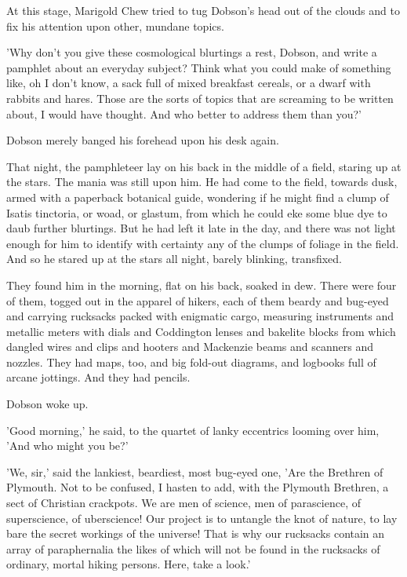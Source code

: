 At this stage, Marigold Chew tried to tug Dobson's head out of the clouds and to fix his attention upon other, mundane topics.

'Why don't you give these cosmological blurtings a rest, Dobson, and write a pamphlet about an everyday subject? Think what you could make of something like, oh I don't know, a sack full of mixed breakfast cereals, or a dwarf with rabbits and hares. Those are the sorts of topics that are screaming to be written about, I would have thought. And who better to address them than you?'

Dobson merely banged his forehead upon his desk again.

That night, the pamphleteer lay on his back in the middle of a field, staring up at the stars. The mania was still upon him. He had come to the field, towards dusk, armed with a paperback botanical guide, wondering if he might find a clump of Isatis tinctoria, or woad, or glastum, from which he could eke some blue dye to daub further blurtings. But he had left it late in the day, and there was not light enough for him to identify with certainty any of the clumps of foliage in the field. And so he stared up at the stars all night, barely blinking, transfixed.

They found him in the morning, flat on his back, soaked in dew. There were four of them, togged out in the apparel of hikers, each of them beardy and bug-eyed and carrying rucksacks packed with enigmatic cargo, measuring instruments and metallic meters with dials and Coddington lenses and bakelite blocks from which dangled wires and clips and hooters and Mackenzie beams and scanners and nozzles. They had maps, too, and big fold-out diagrams, and logbooks full of arcane jottings. And they had pencils.

Dobson woke up.

'Good morning,' he said, to the quartet of lanky eccentrics looming over him, 'And who might you be?'

'We, sir,' said the lankiest, beardiest, most bug-eyed one, 'Are the Brethren of Plymouth. Not to be confused, I hasten to add, with the Plymouth Brethren, a sect of Christian crackpots. We are men of science, men of parascience, of superscience, of uberscience! Our project is to untangle the knot of nature, to lay bare the secret workings of the universe! That is why our rucksacks contain an array of paraphernalia the likes of which will not be found in the rucksacks of ordinary, mortal hiking persons. Here, take a look.'

